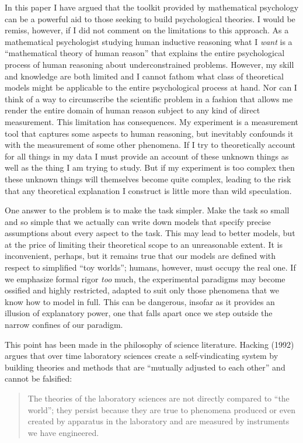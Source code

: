 \documentclass[
  english,
  doc]{apa6}
\begin{document}
\noindent
In this paper I have argued that the toolkit provided by mathematical psychology can be a powerful aid to those seeking to build psychological theories. I would be remiss, however, if I did not comment on the limitations to this approach. As a mathematical psychologist studying human inductive reasoning what I \emph{want} is a \enquote{mathematical theory of human reason} that explains the entire psychological process of human reasoning about underconstrained problems. However, my skill and knowledge are both limited and I cannot fathom what class of theoretical models might be applicable to the entire psychological process at hand. Nor can I think of a way to circumscribe the scientific problem in a fashion that allows me render the entire domain of human reason subject to any kind of direct measurement. This limitation has consequences. My experiment is a measurement tool that captures some aspects to human reasoning, but inevitably confounds it with the measurement of some other phenomena. If I try to theoretically account for all things in my data I must provide an account of these unknown things as well as the thing I am trying to study. But if my experiment is too complex then these unknown things will themselves become quite complex, leading to the risk that any theoretical explanation I construct is little more than wild speculation.

One answer to the problem is to make the task simpler. Make the task so small and so simple that we actually can write down models that specify precise assumptions about every aspect to the task. This may lead to better models, but at the price of limiting their theoretical scope to an unreasonable extent. It is inconvenient, perhaps, but it remains true that our models are defined with respect to simplified \enquote{toy worlds}; humans, however, must occupy the real one. If we emphasize formal rigor \emph{too} much, the experimental paradigms may become ossified and highly restricted, adapted to suit only those phenomena that we know how to model in full. This can be dangerous, insofar as it provides an illusion of explanatory power, one that falls apart once we step outside the narrow confines of our paradigm.

This point has been made in the philosophy of science literature. Hacking (1992) argues that over time laboratory sciences create a self-vindicating system by building theories and methods that are \enquote{mutually adjusted to each other} and cannot be falsified:

\begin{quote}
The theories of the laboratory sciences are not directly compared to \enquote{the world}; they persist because they are true to phenomena produced or even created by apparatus in the laboratory and are measured by instruments we have engineered.
\end{quote}
\end{document}
